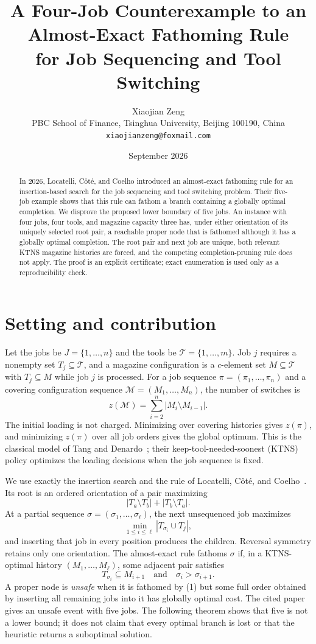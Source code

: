 \documentclass[11pt]{article}
\title{A Four-Job Counterexample to an Almost-Exact Fathoming Rule\\
for Job Sequencing and Tool Switching}
\author{Xiaojian Zeng\\
\small PBC School of Finance, Tsinghua University, Beijing 100190, China\\
\small \texttt{xiaojianzeng@foxmail.com}}
\date{September 2026}
\newcommand{\cT}{\mathcal T}
\newcommand{\cM}{\mathcal M}
\begin{document}
\maketitle

\begin{abstract}
In 2026, Locatelli, C\^ot\'e, and Coelho introduced an almost-exact
fathoming rule for an insertion-based search for the job sequencing and tool
switching problem.  Their five-job example shows that this rule can fathom a
branch containing a globally optimal completion.  We disprove the proposed
lower boundary of five jobs.  An instance with four jobs, four tools, and
magazine capacity three has, under either orientation of its uniquely selected
root pair, a reachable proper node that is fathomed although it has a globally
optimal completion.  The root pair and next job are unique, both relevant
KTNS magazine histories are forced, and the competing completion-pruning rule
does not apply.  The proof is an explicit certificate; exact enumeration is
used only as a reproducibility check.
\end{abstract}

\section{Setting and contribution}

Let the jobs be $J=\{1,\ldots,n\}$ and the tools be
$\cT=\{1,\ldots,m\}$.  Job $j$ requires a nonempty set
$T_j\subseteq\cT$, and a magazine configuration is a $c$-element set
$M\subseteq\cT$ with $T_j\subseteq M$ while job $j$ is processed.  For a
job sequence $\pi=(\pi_1,\ldots,\pi_n)$ and a covering configuration sequence
$\cM=(M_1,\ldots,M_n)$, the number of switches is
\[
  z(\cM)=\sum_{i=2}^n |M_i\setminus M_{i-1}|.
\]
The initial loading is not charged.  Minimizing over covering histories gives
$z(\pi)$, and minimizing $z(\pi)$ over all job orders gives the global optimum.
This is the classical model of Tang and Denardo~\cite{TangDenardo1988}; their
keep-tool-needed-soonest (KTNS) policy optimizes the loading decisions when the
job sequence is fixed.

We use exactly the insertion search and the rule of
Locatelli, C\^ot\'e, and Coelho~\cite{LocatelliCoteCoelho2026}.  Its root is an
ordered orientation of a pair maximizing
\[
  |T_a\setminus T_b|+|T_b\setminus T_a|.
\]
At a partial sequence $\sigma=(\sigma_1,\ldots,\sigma_\ell)$, the next
unsequenced job maximizes
\[
  \min_{1\leq i\leq\ell}|T_{\sigma_i}\cup T_j|,
\]
and inserting that job in every position produces the children.  Reversal
symmetry retains only one orientation.  The almost-exact rule fathoms
$\sigma$ if, in a KTNS-optimal history $(M_1,\ldots,M_\ell)$, some adjacent
pair satisfies
\[
  T_{\sigma_i}\subseteq M_{i+1}
  \quad\text{and}\quad
  \sigma_i>\sigma_{i+1}.                                      \tag{1}
\]
A proper node is \emph{unsafe} when it is fathomed by (1) but some full order
obtained by inserting all remaining jobs into it has globally optimal cost.
The cited paper gives an unsafe event with five jobs.  The following theorem
shows that five is not a lower bound; it does not claim that every optimal
branch is lost or that the heuristic returns a suboptimal solution.
\end{document}
